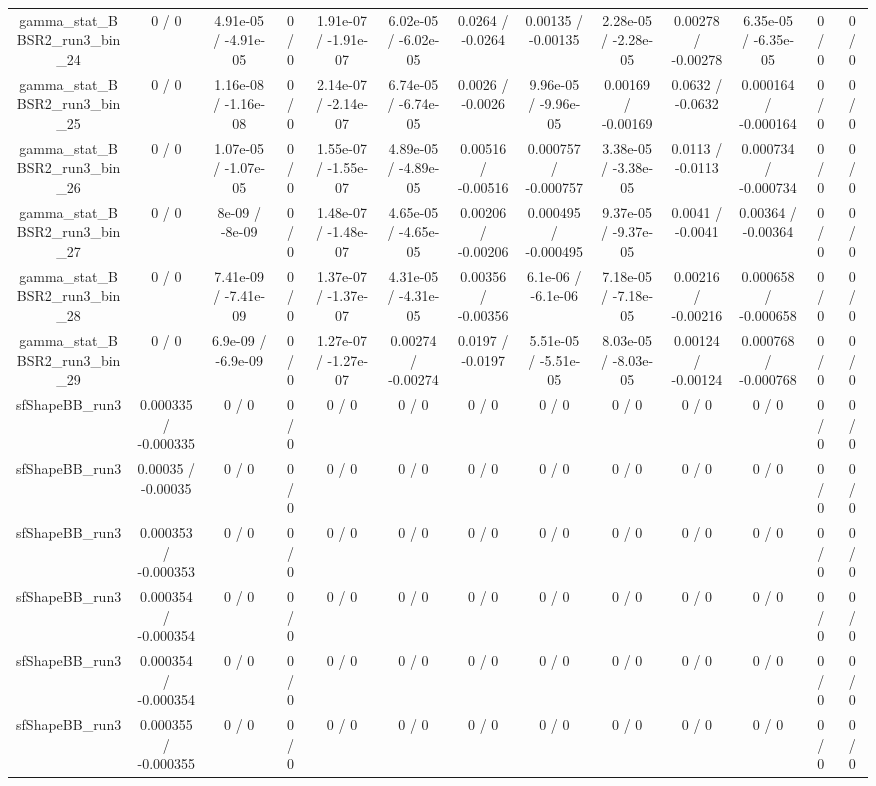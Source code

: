 \documentclass[10pt]{article}
\begin{document}
\begin{table}[htbp]
\begin{center}
\begin{tabular}{|c|c|c|c|c|c|c|c|c|c|c|c|c|}
  gamma_stat_BBSR2_run3_bin_24 & 0 / 0 & 4.91e-05 / -4.91e-05 & 0 / 0 & 1.91e-07 / -1.91e-07 & 6.02e-05 / -6.02e-05 & 0.0264 / -0.0264 & 0.00135 / -0.00135 & 2.28e-05 / -2.28e-05 & 0.00278 / -0.00278 & 6.35e-05 / -6.35e-05 & 0 / 0 & 0 / 0 \\ 
  gamma_stat_BBSR2_run3_bin_25 & 0 / 0 & 1.16e-08 / -1.16e-08 & 0 / 0 & 2.14e-07 / -2.14e-07 & 6.74e-05 / -6.74e-05 & 0.0026 / -0.0026 & 9.96e-05 / -9.96e-05 & 0.00169 / -0.00169 & 0.0632 / -0.0632 & 0.000164 / -0.000164 & 0 / 0 & 0 / 0 \\ 
  gamma_stat_BBSR2_run3_bin_26 & 0 / 0 & 1.07e-05 / -1.07e-05 & 0 / 0 & 1.55e-07 / -1.55e-07 & 4.89e-05 / -4.89e-05 & 0.00516 / -0.00516 & 0.000757 / -0.000757 & 3.38e-05 / -3.38e-05 & 0.0113 / -0.0113 & 0.000734 / -0.000734 & 0 / 0 & 0 / 0 \\ 
  gamma_stat_BBSR2_run3_bin_27 & 0 / 0 & 8e-09 / -8e-09 & 0 / 0 & 1.48e-07 / -1.48e-07 & 4.65e-05 / -4.65e-05 & 0.00206 / -0.00206 & 0.000495 / -0.000495 & 9.37e-05 / -9.37e-05 & 0.0041 / -0.0041 & 0.00364 / -0.00364 & 0 / 0 & 0 / 0 \\ 
  gamma_stat_BBSR2_run3_bin_28 & 0 / 0 & 7.41e-09 / -7.41e-09 & 0 / 0 & 1.37e-07 / -1.37e-07 & 4.31e-05 / -4.31e-05 & 0.00356 / -0.00356 & 6.1e-06 / -6.1e-06 & 7.18e-05 / -7.18e-05 & 0.00216 / -0.00216 & 0.000658 / -0.000658 & 0 / 0 & 0 / 0 \\ 
  gamma_stat_BBSR2_run3_bin_29 & 0 / 0 & 6.9e-09 / -6.9e-09 & 0 / 0 & 1.27e-07 / -1.27e-07 & 0.00274 / -0.00274 & 0.0197 / -0.0197 & 5.51e-05 / -5.51e-05 & 8.03e-05 / -8.03e-05 & 0.00124 / -0.00124 & 0.000768 / -0.000768 & 0 / 0 & 0 / 0 \\ 
  sfShapeBB_run3 & 0.000335 / -0.000335 & 0 / 0 & 0 / 0 & 0 / 0 & 0 / 0 & 0 / 0 & 0 / 0 & 0 / 0 & 0 / 0 & 0 / 0 & 0 / 0 & 0 / 0 \\ 
  sfShapeBB_run3 & 0.00035 / -0.00035 & 0 / 0 & 0 / 0 & 0 / 0 & 0 / 0 & 0 / 0 & 0 / 0 & 0 / 0 & 0 / 0 & 0 / 0 & 0 / 0 & 0 / 0 \\ 
  sfShapeBB_run3 & 0.000353 / -0.000353 & 0 / 0 & 0 / 0 & 0 / 0 & 0 / 0 & 0 / 0 & 0 / 0 & 0 / 0 & 0 / 0 & 0 / 0 & 0 / 0 & 0 / 0 \\ 
  sfShapeBB_run3 & 0.000354 / -0.000354 & 0 / 0 & 0 / 0 & 0 / 0 & 0 / 0 & 0 / 0 & 0 / 0 & 0 / 0 & 0 / 0 & 0 / 0 & 0 / 0 & 0 / 0 \\ 
  sfShapeBB_run3 & 0.000354 / -0.000354 & 0 / 0 & 0 / 0 & 0 / 0 & 0 / 0 & 0 / 0 & 0 / 0 & 0 / 0 & 0 / 0 & 0 / 0 & 0 / 0 & 0 / 0 \\ 
  sfShapeBB_run3 & 0.000355 / -0.000355 & 0 / 0 & 0 / 0 & 0 / 0 & 0 / 0 & 0 / 0 & 0 / 0 & 0 / 0 & 0 / 0 & 0 / 0 & 0 / 0 & 0 / 0 \\ 

\end{tabular}
\end{center}
\end{table}
\end{document}

